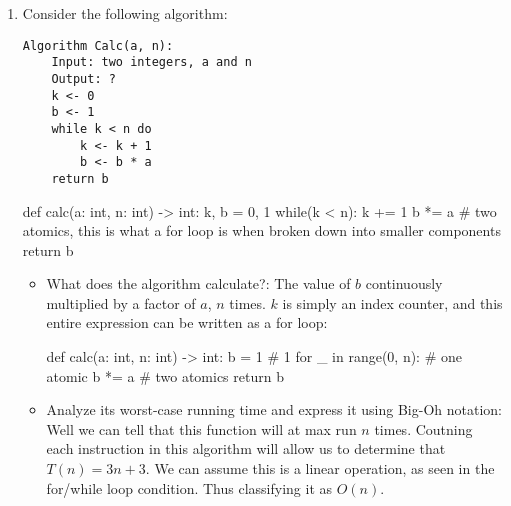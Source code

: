 \documentclass{article}
\begin{document}
\begin{enumerate}
\begin{itemize}
\end{itemize}

\item Consider the following algorithm:
\begin{Verbatim}
Algorithm Calc(a, n):
    Input: two integers, a and n
    Output: ?
    k <- 0
    b <- 1
    while k < n do
        k <- k + 1
        b <- b * a
    return b
\end{Verbatim}

\begin{python}
def calc(a: int, n: int) -> int:
    k, b = 0, 1
    while(k < n):
        k += 1
        b *= a
        # two atomics, this is what a for loop is when broken down into smaller components
    return b
\end{python}

\begin{itemize}
\item What does the algorithm calculate?: The value of $b$ continuously multiplied by a factor of $a$, $n$ times. $k$ is simply an index counter, and this entire expression can be written as a for loop:
\begin{python}
def calc(a: int, n: int) -> int:
    b = 1 # 1
    for _ in range(0, n): # one atomic
        b *= a
        # two atomics
    return b
\end{python}
\item Analyze its worst-case running time and express it using Big-Oh notation: Well we can tell that this function will at max run $n$ times. Coutning each instruction in this algorithm will allow us to determine that $T(n) = 3n + 3$. We can assume this is a linear operation, as seen in the for/while loop condition. Thus classifying it as $O(n)$.
\end{itemize}

\end{enumerate}
\end{document}
